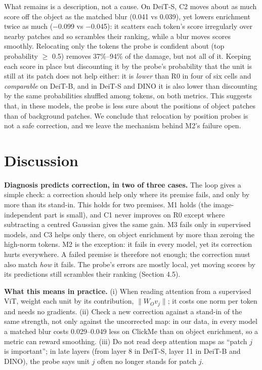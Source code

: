 \documentclass{article}
\begin{document}
What remains is a description, not a cause. On DeiT-S, C2 moves about as much score off the object as the matched blur (0.041 vs 0.039), yet lowers enrichment twice as much ($-$0.099 vs $-$0.045): it scatters each token's score irregularly over nearby patches and so scrambles their ranking, while a blur moves scores smoothly. Relocating only the tokens the probe is confident about (top probability $\ge$ 0.5) removes 37\%--94\% of the damage, but not all of it. Keeping each score in place but discounting it by the probe's probability that the unit is still at its patch does not help either: it is \emph{lower} than R0 in four of six cells and \emph{comparable} on DeiT-B, and in DeiT-S and DINO it is also lower than discounting by the same probabilities shuffled among tokens, on both metrics. This suggests that, in these models, the probe is less sure about the positions of object patches than of background patches. We conclude that relocation by position probes is not a safe correction, and we leave the mechanism behind M2's failure open.

\section{Discussion}

\textbf{Diagnosis predicts correction, in two of three cases.} The loop gives a simple check: a correction should help only where its premise fails, and only by more than its stand-in. This holds for two premises. M1 holds (the image-independent part is small), and C1 never improves on R0 except where subtracting a centred Gaussian gives the same gain. M3 fails only in supervised models, and C3 helps only there, on object enrichment by more than zeroing the high-norm tokens. M2 is the exception: it fails in every model, yet its correction hurts everywhere. A failed premise is therefore not enough; the correction must also match \emph{how} it fails. The probe's errors are mostly local, yet moving scores by its predictions still scrambles their ranking (Section 4.5).

\textbf{What this means in practice.} (i) When reading attention from a supervised ViT, weight each unit by its contribution, $\lVert W_O v_j\rVert$; it costs one norm per token and needs no gradients. (ii) Check a new correction against a stand-in of the same strength, not only against the uncorrected map: in our data, in every model a matched blur costs 0.029--0.049 less on ClickMe than on object enrichment, so a metric can reward smoothing. (iii) Do not read deep attention maps as ``patch $j$ is important''; in late layers (from layer 8 in DeiT-S, layer 11 in DeiT-B and DINO), the probe says unit $j$ often no longer stands for patch $j$.
\end{document}
